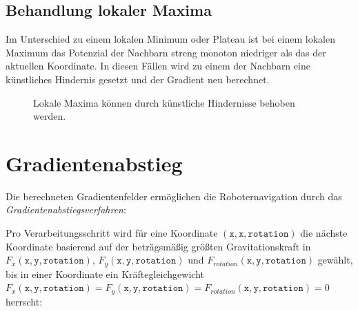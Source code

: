 \subsection{Behandlung lokaler Maxima}

Im Unterschied zu einem lokalen Minimum oder Plateau ist bei einem lokalen Maximum das Potenzial der Nachbarn streng monoton niedriger als das der aktuellen Koordinate.
In diesen Fällen wird zu einem der Nachbarn eine künstliches Hindernis gesetzt und der Gradient neu berechnet.
\begin{figure}[H]
	\centering
	\footnotesize
	\centerline{\resizebox{0.9\linewidth}{!}{}}
	\caption{Lokale Maxima können durch künstliche Hindernisse behoben werden.}
\end{figure}


\section{Gradientenabstieg}

Die berechneten Gradientenfelder ermöglichen die Roboternavigation durch das \textit{Gradientenabstiegsverfahren}:

Pro Verarbeitungsschritt wird für eine Koordinate $(\texttt{x},\texttt{x},\texttt{rotation})$ die nächste Koordinate basierend auf der beträgsmäßig größten Gravitationskraft in $F_{x}(\texttt{x}, \texttt{y}, \texttt{rotation})$, $F_{y}(\texttt{x}, \texttt{y}, \texttt{rotation})$ und $F_{rotation}(\texttt{x}, \texttt{y}, \texttt{rotation})$ gewählt, bis in einer Koordinate ein Kräftegleichgewicht $F_{x}(\texttt{x}, \texttt{y}, \texttt{rotation}) = F_{y}(\texttt{x}, \texttt{y}, \texttt{rotation}) = F_{rotation}(\texttt{x}, \texttt{y}, \texttt{rotation}) = 0$ herrscht:



